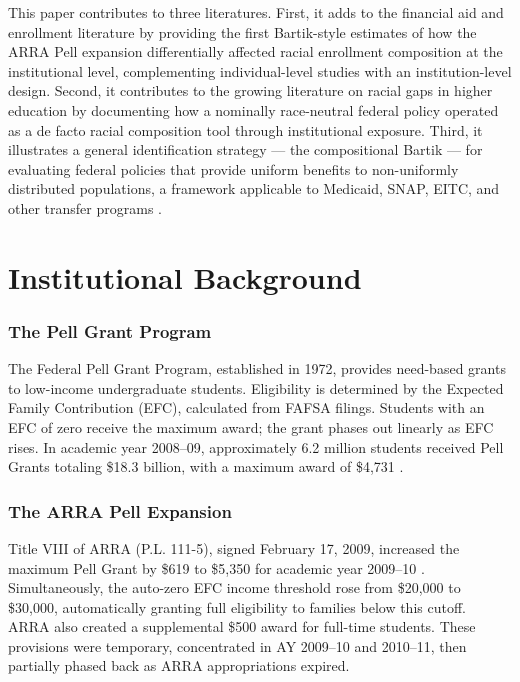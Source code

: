 \documentclass[12pt]{article}
\begin{document}
This paper contributes to three literatures. First, it adds to the financial aid and enrollment literature \citep{dynarski2003does, deming2009into, marx2017borrowing, denning2019propensity} by providing the first Bartik-style estimates of how the ARRA Pell expansion differentially affected racial enrollment composition at the institutional level, complementing individual-level studies with an institution-level design. Second, it contributes to the growing literature on racial gaps in higher education \citep{bound2010have, looney2015earnings, bailey2016returns} by documenting how a nominally race-neutral federal policy operated as a de facto racial composition tool through institutional exposure. Third, it illustrates a general identification strategy --- the compositional Bartik --- for evaluating federal policies that provide uniform benefits to non-uniformly distributed populations, a framework applicable to Medicaid, SNAP, EITC, and other transfer programs \citep{goldsmith2020bartik}.

\section{Institutional Background}

\subsubsection*{The Pell Grant Program} The Federal Pell Grant Program, established in 1972, provides need-based grants to low-income undergraduate students. Eligibility is determined by the Expected Family Contribution (EFC), calculated from FAFSA filings. Students with an EFC of zero receive the maximum award; the grant phases out linearly as EFC rises. In academic year 2008--09, approximately 6.2 million students received Pell Grants totaling \$18.3 billion, with a maximum award of \$4,731 \citep{baum2010pell}.

\subsubsection*{The ARRA Pell Expansion} Title VIII of ARRA (P.L. 111-5), signed February 17, 2009, increased the maximum Pell Grant by \$619 to \$5,350 for academic year 2009--10 \citep{congressionalresearchservice2009}. Simultaneously, the auto-zero EFC income threshold rose from \$20,000 to \$30,000, automatically granting full eligibility to families below this cutoff. ARRA also created a supplemental \$500 award for full-time students. These provisions were temporary, concentrated in AY 2009--10 and 2010--11, then partially phased back as ARRA appropriations expired.
\end{document}
